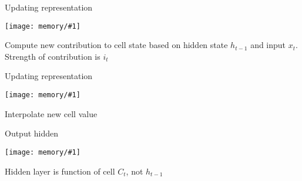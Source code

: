 \documentclass[compress]{beamer}
\newcommand{\gfx}[2]{
\begin{center}
	\texttt{[image: memory/\#1]}
\end{center}
}
\begin{document}
\begin{frame}{Updating representation}

  \gfx{LSTM3-focus-i}{.9}

  Compute new contribution to cell state based on hidden state
  $h_{t-1}$ and input $x_t$.  Strength of contribution is $i_t$

\end{frame}


\begin{frame}{Updating representation}

  \gfx{LSTM3-focus-C}{.9}

  Interpolate new cell value

\end{frame}

\begin{frame}{Output hidden}

  \gfx{LSTM3-focus-o}{.9}

  Hidden layer is function of cell $C_t$, not $h_{t-1}$

\end{frame}
\end{document}
